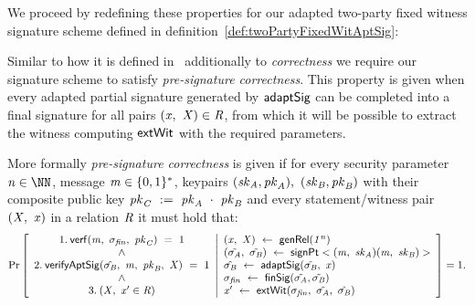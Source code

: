 We proceed by redefining these properties for our adapted two-party fixed witness signature scheme defined in definition~\ref{def:twoPartyFixedWitAptSig}:

\begin{definition}\label{def:preSigCorrectness}
Similar to how it is defined in~\cite{aumayr2020bitcoinchannels} additionally to \textit{correctness} we require our signature scheme to satisfy \textit{pre-signature correctness}.
This property is given when every adapted partial signature generated by $\mathsf{adaptSig}$ can be completed into a final signature for all pairs $(\mathit{x} ,~ \mathit{X}) \in \mathit{R}$, from which it will
be possible to extract the witness computing $\mathsf{extWit}$ with the required parameters.

More formally \textit{pre-signature correctness} is given if for every security parameter $\varN \in \cnstNatural$, message $\mathit{m} \in \{0,1\}^{*}$, keypairs $(\mathit{sk}_{\mathit{A}}, \mathit{pk}_{\mathit{A}}) ,~ (\mathit{sk}_{\mathit{B}}, \mathit{pk}_{\mathit{B}})$
with their composite public key $\mathit{pk}_{\mathit{C}} ~:=~ \mathit{pk}_{\mathit{A}} ~\cdot~ \mathit{pk}_{\mathit{B}}$ and every statement/witness pair $(\mathit{X} ,~ \mathit{x})$ in a relation $\mathit{R}$ it must hold that:
\[
    \Pr\left[
    \begin{array}{c}
        1.\:\mathsf{verf}(\mathit{m} ,~ \sigma_{\mathit{fin}} ,~ \mathit{pk}_{\mathit{C}}) ~=~ 1 \\
        ~\land~ \\
        2.\: \mathsf{verifyAptSig}(\hat{\sigma_{\mathit{B}}} ,~ \mathit{m} ,~ \mathit{pk}_{\mathit{B}} ,~ \mathit{X}) ~=~ 1 \\
        ~\land~ \\
        3.\:(\mathit{X} ,~ \mathit{x}' \in \mathit{R})
    \end{array}
    \middle\vert
    \begin{array}{l}
        (\mathit{x} ,~ \mathit{X}) ~\leftarrow~ \mathsf{genRel}(\mathit{1^n}) \\
        (\tilde{\sigma_{\mathit{A}}} ,~ \tilde{\sigma_{\mathit{B}}}) ~\leftarrow~ \mathsf{signPt}<(\mathit{m} ,~ \mathit{sk}_{\mathit{A}})(\mathit{m} ,~ \mathit{sk}_{\mathit{B}})> \\
        \hat{\sigma_{\mathit{B}}} ~\leftarrow~ \mathsf{adaptSig}(\tilde{\sigma_{\mathit{B}}} ,~ \mathit{x}) \\
        \sigma_{\mathit{fin}} ~\leftarrow~ \mathsf{finSig}(\tilde{\sigma_{\mathit{A}}},\tilde{\sigma_{\mathit{B}}}) \\
        \mathit{x}' ~\leftarrow~ \mathsf{extWit}(\sigma_{\mathit{fin}} ,~ \tilde{\sigma_{\mathit{A}}} ,~ \hat{\sigma_{\mathit{B}}})
    \end{array}
    \right]=1.
\]
\end{definition}

